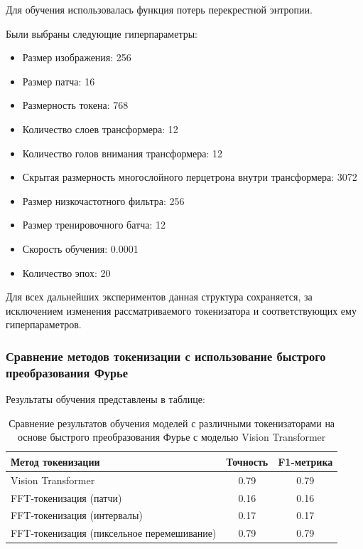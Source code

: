 \documentclass[times,specification,annotation]{itmo-student-thesis}
\begin{document}
Для обучения использовалась функция потерь перекрестной энтропии.

Были выбраны следующие гиперпараметры:

\begin{itemize}
    \item Размер изображения: 256
    \item Размер патча: 16
    \item Размерность токена: 768
    \item Количество слоев трансформера: 12
    \item Количество голов внимания трансформера: 12
    \item Скрытая размерность многослойного перцетрона внутри трансформера: 3072
    \item Размер низкочастотного фильтра: 256
    \item Размер тренировочного батча: 12
    \item Скорость обучения: 0.0001
    \item Количество эпох: 20
\end{itemize}

Для всех дальнейших экспериментов данная структура сохраняется, за исключением изменения рассматриваемого токенизатора и соответствующих ему гиперпараметров.

\subsubsection{Сравнение методов токенизации с использование быстрого преобразования Фурье}

Результаты обучения представлены в таблице:

\begin{table}[H]
  \centering
  \caption{Сравнение результатов обучения моделей с различными токенизаторами на основе быстрого преобразования Фурье с моделью Vision Transformer}
  \label{tab:fft-tokenization}
  \begin{tabular}{|l|c|c|}
    \hline
    Метод токенизации & Точность & F1-метрика \\ \hline
    Vision Transformer & 0.79 & 0.79  \\
    FFT-токенизация (патчи) & 0.16 & 0.16  \\ 
    FFT-токенизация (интервалы)  & 0.17 & 0.17  \\ 
    FFT-токенизация (пиксельное перемешивание) & 0.79 & 0.79 \\
    \hline
  \end{tabular}
\end{table}
\end{document}
